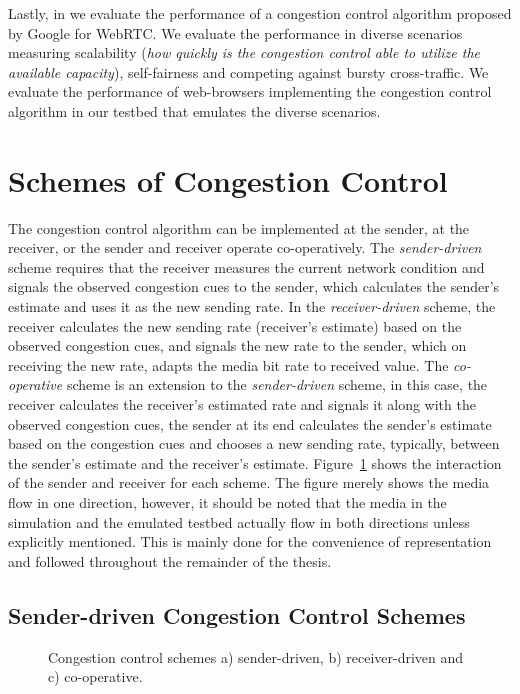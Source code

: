 Lastly, in  we evaluate the performance of a congestion
control algorithm proposed by Google for WebRTC. We evaluate the performance
in diverse scenarios measuring scalability (\emph{how quickly is the
congestion control able to utilize the available capacity}), self-fairness and
competing against bursty cross-traffic. We evaluate the performance of
web-browsers implementing the congestion control algorithm in our testbed that
emulates the diverse scenarios.

\section{Schemes of Congestion Control}

The congestion control algorithm can be implemented at the sender, at the
receiver, or the sender and receiver operate co-operatively. The
\emph{sender-driven} scheme requires that the receiver measures the current
network condition and signals the observed congestion cues to the sender, which
calculates the sender's estimate and uses it as the new sending rate. In the
\emph{receiver-driven} scheme, the receiver calculates the new sending rate
(receiver's estimate) based on the observed congestion cues, and signals the
new rate to the sender, which on receiving the new rate, adapts the media bit
rate to received value. The \emph{co-operative} scheme is an extension to the
\emph{sender-driven} scheme, in this case, the receiver calculates the
receiver's estimated rate and signals it along with the observed congestion
cues, the sender at its end calculates the sender's estimate based on the
congestion cues and chooses a new sending rate, typically, between the
sender's estimate and the receiver's estimate. Figure~\ref{fig:cc:scheme}
shows the interaction of the sender and receiver for each scheme. The figure
merely shows the media flow in one direction, however, it should be noted that
the media in the simulation and the emulated testbed actually flow in both
directions unless explicitly mentioned. This is mainly done for the
convenience of representation and followed throughout the remainder of the
thesis.

\subsection{Sender-driven Congestion Control Schemes}

\begin{figure}[!t]
  \centerline{
  }
  \centerline{
  }
  \centerline{
  }
  \caption{Congestion control schemes a) sender-driven, b) receiver-driven
and c) co-operative.}
  \label{fig:cc:scheme}
\end{figure}

